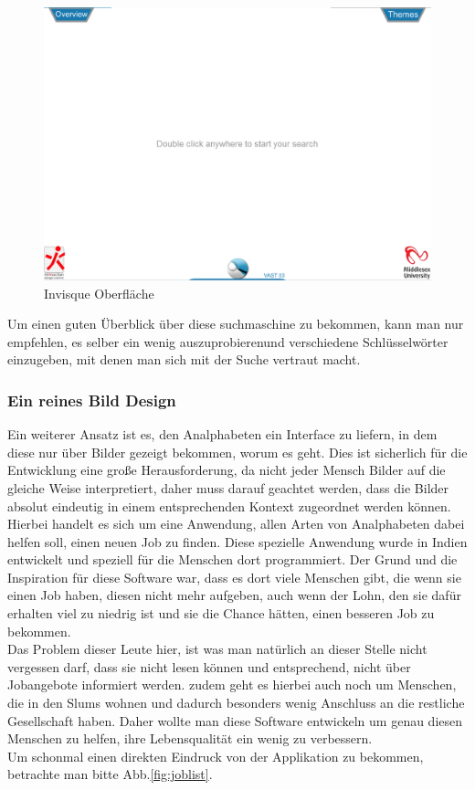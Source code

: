\begin{figure}[h]
	\centering
		\includegraphics[width=1.00\textwidth]{Daten/Inisque.PNG}
	\caption{Invisque Oberfläche}
	\label{fig:Invisque}
\end{figure}

Um einen guten Überblick über diese suchmaschine zu bekommen, kann man nur empfehlen, es selber ein wenig auszuprobierenund verschiedene Schlüsselwörter einzugeben, mit denen man sich mit der Suche vertraut macht.

\subsubsection{Ein reines Bild Design}

Ein weiterer Ansatz ist es, den Analphabeten ein Interface zu liefern, in dem diese nur über Bilder gezeigt bekommen, worum es geht. Dies ist sicherlich für die Entwicklung eine große Herausforderung, da nicht jeder Mensch Bilder auf die gleiche Weise interpretiert, daher muss darauf geachtet werden, dass die Bilder absolut eindeutig in einem entsprechenden Kontext zugeordnet werden können.\\
Hierbei handelt es sich um eine Anwendung, allen Arten von Analphabeten dabei helfen soll, einen neuen Job zu finden. Diese spezielle Anwendung wurde in Indien entwickelt und speziell für die Menschen dort programmiert. Der Grund und die Inspiration für diese Software war, dass es dort viele Menschen gibt, die wenn sie einen Job haben, diesen nicht mehr aufgeben, auch wenn der Lohn, den sie dafür erhalten viel zu niedrig ist und sie die Chance hätten, einen besseren Job zu bekommen.\\
Das Problem dieser Leute hier, ist was man natürlich an dieser Stelle nicht vergessen darf, dass sie nicht lesen können und entsprechend, nicht über Jobangebote informiert werden. zudem geht es hierbei auch noch um Menschen, die in den Slums wohnen und dadurch besonders wenig Anschluss an die restliche Gesellschaft haben. Daher wollte man diese Software entwickeln um genau diesen Menschen zu helfen, ihre Lebensqualität ein wenig zu verbessern.\\
Um schonmal einen direkten Eindruck von der Applikation zu bekommen, betrachte man bitte Abb.\ref{fig:joblist}.


